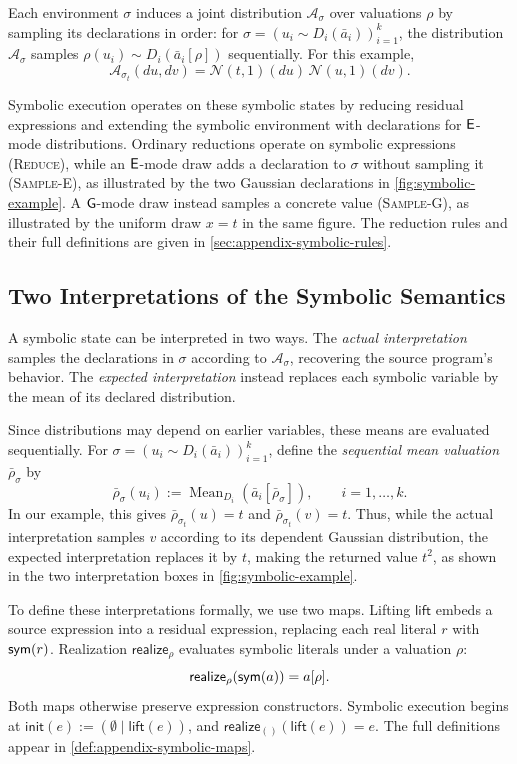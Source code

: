 Each environment $\sigma$ induces a joint distribution
$\mathcal A_\sigma$
over valuations $\rho$ by sampling its declarations
in order: for
$\sigma=(u_i\sim D_i(\bar a_i))_{i=1}^k$,
the distribution $\mathcal A_\sigma$ samples
$\rho(u_i)\sim D_i(\bar a_i[\rho])$ sequentially. For this example,
\[
  \mathcal A_{\sigma_t}(du,dv)
  =\mathcal N(t,1)(du)\,\mathcal N(u,1)(dv).
\]

Symbolic execution operates on these symbolic states by reducing
residual expressions and extending the symbolic environment with
declarations for $\mathsf{E}$-mode distributions. Ordinary reductions
operate on symbolic expressions (\textsc{Reduce}), while an
$\mathsf{E}$-mode draw adds a declaration to $\sigma$ without sampling it
(\textsc{Sample-E}), as illustrated by the two Gaussian declarations
in \cref{fig:symbolic-example}. A $\mathsf{G}$-mode draw instead samples a
concrete value (\textsc{Sample-G}), as illustrated by the uniform
draw $x=t$ in the same figure. The reduction rules and their full
definitions are given in \cref{sec:appendix-symbolic-rules}.

\subsection{Two Interpretations of the Symbolic Semantics}
\label{sec:symbolic-interpretations}

A symbolic state can be interpreted in two ways.
The \emph{actual interpretation} samples the
declarations in $\sigma$ according to
$\mathcal A_\sigma$, recovering the source program's
behavior. The \emph{expected interpretation} instead
replaces each symbolic variable by the mean of its
declared distribution.

Since distributions may depend on earlier variables,
these means are evaluated sequentially. For
$\sigma=(u_i\sim D_i(\bar a_i))_{i=1}^k$,
define the \emph{sequential mean valuation}
$\bar\rho_\sigma$ by
\[
  \bar\rho_\sigma(u_i)
  :=\operatorname{Mean}_{D_i}
       (\bar a_i[\bar\rho_\sigma]),
  \qquad i=1,\ldots,k.
\]
In our example, this gives
$\bar\rho_{\sigma_t}(u)=t$ and
$\bar\rho_{\sigma_t}(v)=t$.
Thus, while the actual interpretation samples
$v$ according to its dependent Gaussian distribution,
the expected interpretation replaces it by $t$,
making the returned value $t^2$, as shown in the two interpretation boxes in \cref{fig:symbolic-example}.

To define these interpretations formally, we use
two maps. Lifting $\mathsf{lift}$ embeds a source
expression into a residual expression, replacing
each real literal $r$ with $\mathsf{sym}(r)$.
Realization $\mathsf{realize}_\rho$ evaluates
symbolic literals under a valuation $\rho$:
\[
  \mathsf{realize}_\rho(\mathsf{sym}(a))=a[\rho].
\]
Both maps otherwise preserve expression constructors.
Symbolic execution begins at
$\mathsf{init}(e):=(\emptyset\mid\mathsf{lift}(e))$,
and $\mathsf{realize}_{()}(\mathsf{lift}(e))=e$.
The full definitions appear in
\cref{def:appendix-symbolic-maps}.

